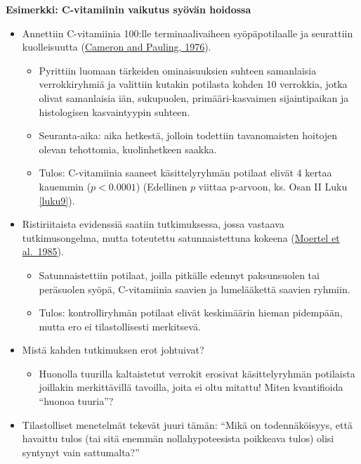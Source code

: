 \documentclass[
]{book}
\providecommand{\tightlist}{%
  \setlength{\itemsep}{0pt}\setlength{\parskip}{0pt}}
\begin{document}
\begin{eblock}{}

\textbf{Esimerkki: C-vitamiinin vaikutus syövän hoidossa}

\begin{itemize}
\tightlist
\item
  Annettiin C-vitamiinia 100:lle terminaalivaiheen syöpäpotilaalle ja
  seurattiin kuolleisuutta (\href{https://pubmed.ncbi.nlm.nih.gov/1068480/}{Cameron and Pauling, 1976}).

  \begin{itemize}
  \tightlist
  \item
    Pyrittiin luomaan tärkeiden ominaisuuksien suhteen samanlaisia verrokkiryhmiä ja valittiin kutakin potilasta kohden 10 verrokkia, jotka olivat samanlaisia iän, sukupuolen, primääri-kasvaimen sijaintipaikan ja histologisen kasvaintyypin suhteen.
  \item
    Seuranta-aika: aika hetkestä, jolloin todettiin tavanomaisten hoitojen olevan tehottomia, kuolinhetkeen saakka.
  \item
    Tulos: C-vitamiinia saaneet käsittelyryhmän potilaat elivät 4 kertaa kauemmin (\(p < 0.0001\)) (Edellinen \(p\) viittaa p-arvoon, ks. Osan II Luku \ref{luku9}).
  \end{itemize}
\item
  Ristiriitaista evidenssiä saatiin tutkimuksessa, jossa vastaava tutkimusongelma, mutta toteutettu satunnaistettuna kokeena (\href{https://pubmed.ncbi.nlm.nih.gov/3880867/}{Moertel et al.~1985}).

  \begin{itemize}
  \tightlist
  \item
    Satunnaistettiin potilaat, joilla pitkälle edennyt paksunsuolen tai peräsuolen syöpä, C-vitamiinia saavien ja lumelääkettä saavien ryhmiin.
  \item
    Tulos: kontrolliryhmän potilaat elivät keskimäärin hieman pidempään, mutta ero ei tilastollisesti merkitsevä.
  \end{itemize}
\item
  Mistä kahden tutkimuksen erot johtuivat?

  \begin{itemize}
  \tightlist
  \item
    Huonolla tuurilla kaltaistetut verrokit erosivat käsittelyryhmän potilaista joillakin merkittävillä tavoilla, joita ei oltu mitattu! Miten kvantifioida ``huonoa tuuria''?
  \end{itemize}
\item
  Tilastolliset menetelmät tekevät juuri tämän: ``Mikä on todennäköisyys, että havaittu tulos (tai sitä enemmän nollahypoteesista poikkeava tulos) olisi syntynyt vain sattumalta?''


\end{itemize}
\end{eblock}
\end{document}

